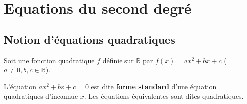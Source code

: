 \documentclass[main.tex]{subfiles}
\begin{document}
 
\newpage 
{}  
\pagestyle{scrheadings} %
\onehalfspacing 
\setcounter{chapter}{2}
\chapter{Equations du second degré}  
 \section{Notion d'équations quadratiques}

Soit une fonction quadratique $f$ définie sur $\mathbb{R}$ par $f(x)=ax^2+bx+c$ ($a\neq0, b, c\in\mathbb{R}$). 

L'équation $ax^2+bx+c=0$ est dite \textbf{forme standard} d'une équation quadratiques d'inconnue $x$. Les équations équivalentes sont dites quadratiques.
 
\end{document}
